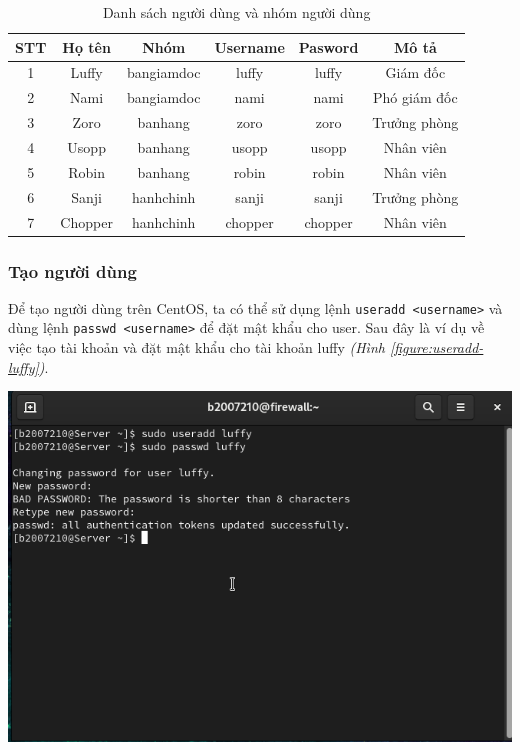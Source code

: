 \documentclass[a4paper, 11pt]{article}
\begin{document}
\begin{longtable}{|c|c|c|c|c|c|}
    \caption{Danh sách người dùng và nhóm người dùng}              \\
    \hline
    STT & Họ tên  & Nhóm       & Username & Pasword & Mô tả        \\
    \hline

    1   & Luffy   & bangiamdoc & luffy    & luffy   & Giám đốc     \\
    \hline

    2   & Nami    & bangiamdoc & nami     & nami    & Phó giám đốc \\
    \hline

    3   & Zoro    & banhang    & zoro     & zoro    & Trưởng phòng \\
    \hline

    4   & Usopp   & banhang    & usopp    & usopp   & Nhân viên    \\
    \hline

    5   & Robin   & banhang    & robin    & robin   & Nhân viên    \\
    \hline

    6   & Sanji   & hanhchinh  & sanji    & sanji   & Trưởng phòng \\
    \hline

    7   & Chopper & hanhchinh  & chopper  & chopper & Nhân viên    \\
    \hline
\end{longtable}

\subsubsection{Tạo người dùng}

Để tạo người dùng trên CentOS, ta có thể sử dụng lệnh \texttt{useradd <username>} và dùng lệnh \texttt{passwd <username>} để đặt mật khẩu cho user.
Sau đây là ví dụ về việc tạo tài khoản và đặt mật khẩu cho tài khoản luffy \textit{(Hình \ref{figure:useradd-luffy})}.

\begin{minipage}
    {\linewidth}
    \captionsetup{type=figure}
    \centering
    \includegraphics[width=\linewidth]{images/useradd-luffy.png}
    \caption{Tạo và đặt mật khẩu cho tài khoản luffy}
    \label{figure:useradd-luffy}
\end{minipage}
\end{document}
